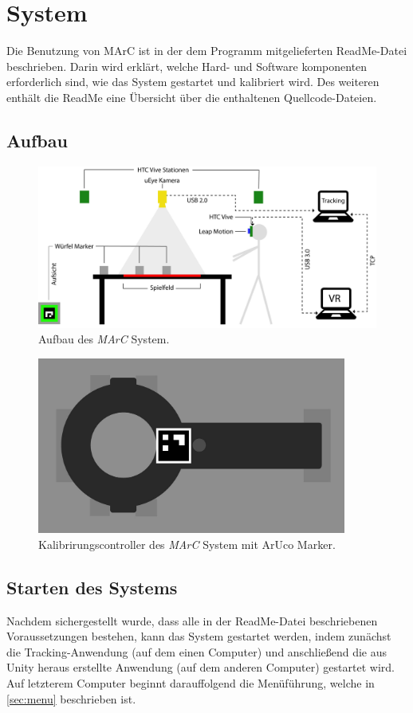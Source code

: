 \section{System}
Die Benutzung von MArC ist in der dem Programm mitgelieferten ReadMe-Datei beschrieben. Darin wird erklärt, welche Hard- und Software komponenten erforderlich sind, wie das System gestartet und kalibriert wird. Des weiteren enthält die ReadMe eine Übersicht über die enthaltenen Quellcode-Dateien.
\subsection{Aufbau}\label{sec:Aufbau}
\begin{figure}[H]
	\centering
	\includegraphics[width=\textwidth]{Bilder/Aufbau_MArC.jpg}
	\caption{Aufbau des \textit{MArC} System.}
	\label{fig:AufbauMarc}
\end{figure}

\begin{figure}[H]
	\centering
	\includegraphics[width=4in]{Bilder/CalibController.jpg}
	\caption{Kalibrirungscontroller des \textit{MArC} System mit ArUco Marker.}
	\label{fig:KontrollerMarc}
\end{figure}


\subsection{Starten des Systems}
Nachdem sichergestellt wurde, dass alle in der ReadMe-Datei beschriebenen Voraussetzungen bestehen, kann das System gestartet werden, indem zunächst die Tracking-Anwendung (auf dem einen Computer) und anschließend die aus Unity heraus erstellte Anwendung (auf dem anderen Computer) gestartet wird. Auf letzterem Computer beginnt darauffolgend die Menüführung, welche in \ref{sec:menu} beschrieben ist. 

